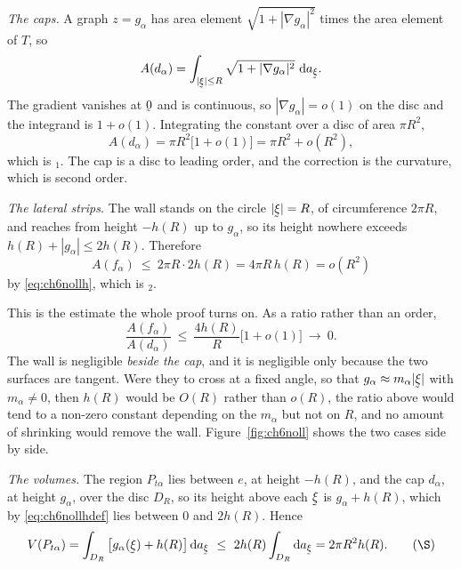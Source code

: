 \emph{The caps.} A graph $z=g_{\alpha}$ has area element
$\sqrt{1+|\nabla g_{\alpha}|^{2}}$ times the area element of $T$, so
\[
   A(d_{\alpha})=\int_{|\vek{\xi}|\le R}
   \sqrt{1+|\nabla g_{\alpha}|^{2}}\ \dl a_{\vek{\xi}} .
\]
The gradient vanishes at $\bze$ and is continuous, so
$|\nabla g_{\alpha}|=o(1)$ on the disc and the integrand is $1+o(1)$.
Integrating the constant over a disc of area $\pi R^{2}$,
\[
   A(d_{\alpha})=\pi R^{2}\big[1+o(1)\big]=\pi R^{2}+o(R^{2}),
\]
which is $_{1}$. The cap is a disc to leading order, and the
correction is the curvature, which is second order.

\emph{The lateral strips.} The wall stands on the circle
$|\vek{\xi}|=R$, of circumference $2\pi R$, and reaches from height
$-h(R)$ up to $g_{\alpha}$, so its height nowhere exceeds
$h(R)+|g_{\alpha}|\le 2h(R)$. Therefore
\[
   A(f_{\alpha})\ \le\ 2\pi R\cdot 2h(R)=4\pi R\,h(R)=o(R^{2})
\]
by \eqref{eq:ch6nollh}, which is $_{2}$.

This is the estimate the whole proof turns on. As a ratio rather than an
order,
\[
   \frac{A(f_{\alpha})}{A(d_{\alpha})}\ \le\ \frac{4h(R)}{R}
   \big[1+o(1)\big]\ \longrightarrow\ 0 .
\]
The wall is negligible \emph{beside the cap}, and it is negligible only
because the two surfaces are tangent. Were they to cross at a fixed
angle, so that $g_{\alpha}\approx m_{\alpha}|\vek{\xi}|$ with
$m_{\alpha}\neq0$, then $h(R)$ would be $O(R)$ rather than $o(R)$, the
ratio above would tend to a non-zero constant depending on the
$m_{\alpha}$ but not on $R$, and no amount of shrinking would remove
the wall. Figure~\ref{fig:ch6noll} shows the two cases side by side.

\emph{The volumes.} The region $P_{t\alpha}$ lies between $e$, at height
$-h(R)$, and the cap $d_{\alpha}$, at height $g_{\alpha}$, over the disc
$D_{R}$, so its height above each $\vek{\xi}$ is $g_{\alpha}+h(R)$,
which by \eqref{eq:ch6nollhdef} lies between $0$ and $2h(R)$. Hence
\begin{equation}
   V(P_{t\alpha})=\int_{D_{R}}\big[g_{\alpha}(\vek{\xi})+h(R)\big]
   \,\dl a_{\vek{\xi}}
   \ \le\ 2h(R)\int_{D_{R}}\dl a_{\vek{\xi}}
   =2\pi R^{2}h(R).
   \tag{$\S$}\label{eq:ch6nollvol}
\end{equation}

